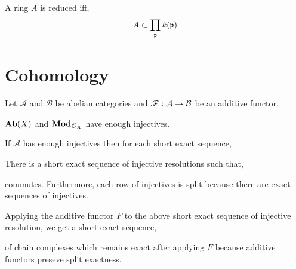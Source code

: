 \documentclass[12pt]{article}
\begin{document}
\begin{lemma}
A ring $A$ is reduced iff,
\[ A \subset \prod_{\mathfrak{p}} k(\mathfrak{p}) \]
\end{lemma}


\section{Cohomology}

Let $\mathcal{A}$ and $\mathcal{B}$ be abelian categories and $\mathscr{F} : \mathcal{A} \to \mathcal{B}$ be an additive functor. 

\begin{theorem}
$\mathbf{Ab}(X)$ and $\mathbf{Mod}_{\mathcal{O}_{X}}$ have enough injectives. 
\end{theorem}

\begin{lemma}
If $\mathcal{A}$ has enough injectives then for each short exact sequence,
\begin{center}
\end{center}
There is a short exact sequence of injective resolutions such that,
\begin{center}
\end{center}
commutes. Furthermore, each row of injectives is split because there are exact sequences of injectives. 
\end{lemma}

\begin{corollary}
Applying the additive functor $F$ to the above short exact sequence of injective resolution, we get a short exact sequence,
\begin{center}
\end{center} 
of chain complexes which remains exact after applying $F$ because additive functors preseve split exactness. 
\end{corollary}
\end{document}
